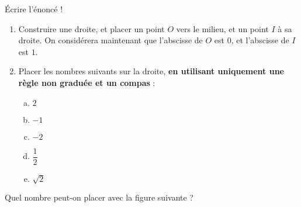\documentclass{beamer}
\begin{document}
\begin{frame}
	{\small Écrire l'énoncé !}
	\begin{enumerate}
		\item Construire une droite, et placer un point $O$ vers le milieu, et un point $I$ à sa droite. On considérera maintenant que l'abscisse de $O$ est $0$, et l'abscisse de $I$ est $1$.
		\item Placer les nombres suivants sur la droite, \textbf{en utilisant uniquement une règle non graduée et un compas} :
		      \begin{enumerate}[a.]
			      \item $2$
			      \item $-1$
			      \item $-2$
			      \item $\dfrac{1}{2}$
			      \item $\sqrt{2}$
		      \end{enumerate}
	\end{enumerate}


\end{frame}

\newcommand{\placePoint}[3]{
	\draw[#3] (#1, 0) -- ++(0,-0.2) node[below] {#2};
}

\begin{frame}
	\begin{center}
	\end{center}
\end{frame}


\begin{frame}
	Quel nombre peut-on placer avec la figure suivante ?
	\begin{center}
	\end{center}
\end{frame}
\end{document}
